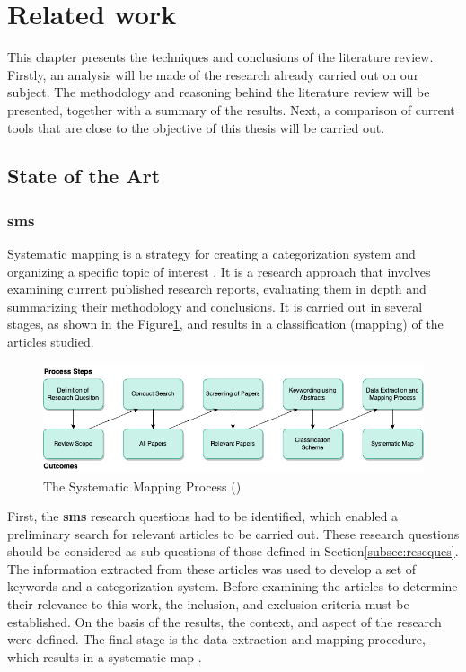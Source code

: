 \section{Related work\label{sec:relwork}}
This chapter presents the techniques and conclusions of the literature review. Firstly, an analysis will be made of the research already carried out on our subject. The methodology and reasoning behind the literature review will be presented, together with a summary of the results. Next, a comparison of current tools that are close to the objective of this thesis will be carried out.\\

    \subsection{State of the Art}
        \subsubsection{\acrfull{sms}}
        Systematic mapping is a strategy for creating a categorization system and organizing a specific topic of interest \cite{petersen2008systematic}. It is a research approach that involves examining current published research reports, evaluating them in depth and summarizing their methodology and conclusions. It is carried out in several stages, as shown in the Figure\ref{fig:SysMapProcess}, and results in a classification (mapping) of the articles studied.\\

        \begin{figure}[h]
            \centering
            \includegraphics[scale=0.6]{images/RelatedWork-SysMapProcess.drawio.png}
            \caption{\label{fig:SysMapProcess}  The Systematic Mapping Process (\cite{petersen2008systematic})}
        \end{figure}

        First, the \textbf{\acrshort{sms}} research questions had to be identified, which enabled a preliminary search for relevant articles to be carried out. These research questions should be considered as sub-questions of those defined in Section\ref{subsec:reseques}. The information extracted from these articles was used to develop a set of keywords and a categorization system. Before examining the articles to determine their relevance to this work, the inclusion, and exclusion criteria must be established. On the basis of the results, the context, and aspect of the research were defined. The final stage is the data extraction and mapping procedure, which results in a systematic map \cite{petersen2008systematic, petersen2015guidelines}.\\

